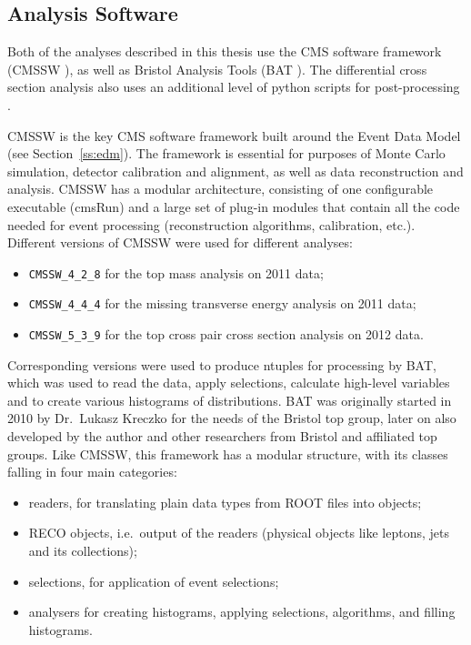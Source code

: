 \subsection{Analysis Software}
\label{ss:analysis_software}
Both of the analyses described in this thesis use the CMS software framework (CMSSW \autocite{CMSSW}), as well as
Bristol Analysis Tools (BAT \autocite{BAT}). The differential cross section analysis also uses an additional level of
python scripts for post-processing \autocite{DailyPythonScripts}.

CMSSW is the key CMS software framework built around the Event Data Model (see Section~\ref{ss:edm}). The framework is
essential for purposes of Monte Carlo simulation, detector calibration and alignment, as well as data reconstruction
and analysis. CMSSW has a modular architecture, consisting of one configurable executable (cmsRun) and a large set of
plug-in modules that contain all the code needed for event processing (reconstruction algorithms, calibration, etc.).
Different versions of CMSSW were used for different analyses: 

\begin{itemize}
  \item \verb!CMSSW_4_2_8! for the top mass analysis on 2011 data;
  \item \verb!CMSSW_4_4_4! for the missing transverse energy analysis on 2011 data;
  \item \verb!CMSSW_5_3_9! for the top cross pair cross section analysis on 2012 data.
\end{itemize}

Corresponding versions were used to produce ntuples for processing by BAT, which was used to read the data, apply
selections, calculate high-level variables and to create various histograms of distributions. BAT was originally started
in 2010 by Dr.\ Lukasz Kreczko for the needs of the Bristol top group, later on also developed by the author and other
researchers from Bristol and affiliated top groups. Like CMSSW, this framework has a modular structure, with its classes
falling in four main categories:

\begin{itemize}
  \item readers, for translating plain data types from ROOT files into \Cplusplus objects;
  \item RECO objects, i.e.\ output of the readers (physical objects like leptons, jets and its collections);
  \item selections, for application of event selections;
  \item analysers for creating histograms, applying selections, algorithms, and filling histograms.
\end{itemize}

